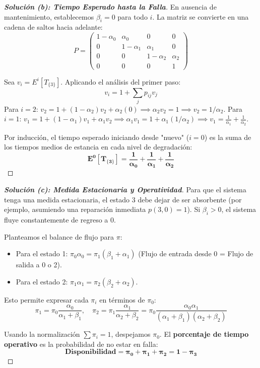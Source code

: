 \documentclass[10pt,a4paper]{article}
\begin{document}
\vspace{5mm}

\begin{proof}[\textbf{Solución (b): Tiempo Esperado hasta la Falla}]
    En ausencia de mantenimiento, establecemos $\beta_i = 0$ para todo $i$. La matriz se convierte en una cadena de saltos hacia adelante:
    \[ P = \begin{pmatrix} 
    1-\alpha_0 & \alpha_0 & 0 & 0 \\
    0 & 1-\alpha_1 & \alpha_1 & 0 \\
    0 & 0 & 1-\alpha_2 & \alpha_2 \\
    0 & 0 & 0 & 1 
    \end{pmatrix} \]
    
    Sea $v_i = E^i[T_{\{3\}}]$. Aplicando el análisis del primer paso:
    \[ v_i = 1 + \sum_j p_{ij} v_j \]
    Para $i=2$: $v_2 = 1 + (1-\alpha_2)v_2 + \alpha_2(0) \implies \alpha_2 v_2 = 1 \implies v_2 = 1/\alpha_2$.
    Para $i=1$: $v_1 = 1 + (1-\alpha_1)v_1 + \alpha_1 v_2 \implies \alpha_1 v_1 = 1 + \alpha_1(1/\alpha_2) \implies v_1 = \frac{1}{\alpha_1} + \frac{1}{\alpha_2}$.
    
    Por inducción, el tiempo esperado iniciando desde "nuevo" ($i=0$) es la suma de los tiempos medios de estancia en cada nivel de degradación:
    \[ \mathbf{E^0[T_{\{3\}}] = \frac{1}{\alpha_0} + \frac{1}{\alpha_1} + \frac{1}{\alpha_2}} \]
\end{proof}

\vspace{5mm}

\begin{proof}[\textbf{Solución (c): Medida Estacionaria y Operatividad}]
    Para que el sistema tenga una medida estacionaria, el estado 3 debe dejar de ser absorbente (por ejemplo, asumiendo una reparación inmediata $p(3,0) = 1$). Si $\beta_i > 0$, el sistema fluye constantemente de regreso a 0.
    
    Planteamos el balance de flujo para $\pi$:
    \begin{itemize}
        \item Para el estado 1: $\pi_0 \alpha_0 = \pi_1 (\beta_1 + \alpha_1)$ (Flujo de entrada desde 0 = Flujo de salida a 0 o 2).
        \item Para el estado 2: $\pi_1 \alpha_1 = \pi_2 (\beta_2 + \alpha_2)$.
    \end{itemize}
    Esto permite expresar cada $\pi_i$ en términos de $\pi_0$:
    \[ \pi_1 = \pi_0 \frac{\alpha_0}{\alpha_1 + \beta_1}, \quad \pi_2 = \pi_1 \frac{\alpha_1}{\alpha_2 + \beta_2} = \pi_0 \frac{\alpha_0 \alpha_1}{(\alpha_1 + \beta_1)(\alpha_2 + \beta_2)} \]
    
    Usando la normalización $\sum \pi_i = 1$, despejamos $\pi_0$. 
    El \textbf{porcentaje de tiempo operativo} es la probabilidad de no estar en falla:
    \[ \mathbf{\text{Disponibilidad} = \pi_0 + \pi_1 + \pi_2 = 1 - \pi_3} \]
\end{proof}
\end{document}
